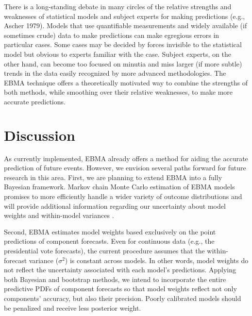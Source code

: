\documentclass[12pt,fullpage,endnotes]{article}
\begin{document}
 

There is a long-standing debate in many circles of the relative
strengths and weaknesses of statistical models and subject experts for
making predictions (e.g., Ascher 1979). Models that use quantifiable
measurements and widely available (if sometimes crude) data to make
predictions can make egregious errors in particular cases. Some cases
may be decided by forces invisible to the statistical model but
obvious to experts familiar with the case. Subject experts, on the
other hand, can become too focused on minutia and miss larger (if more
subtle) trends in the data easily recognized by more advanced
methodologies. The EBMA technique offers a theoretically motivated way
to combine the strengths of both methods, while smoothing over their
relative weaknesses, to make more accurate predictions.

\section{Discussion} %

As currently implemented, EBMA already offers a method for aiding the
accurate prediction of future events.  However, we envision several
paths forward for future research in this area. First, we are planning
to extend EBMA into a fully Bayesian framework. Markov chain Monte
Carlo estimation of EBMA models promises to more efficiently handle a
wider variety of outcome distributions and will provide additional
information regarding our uncertainty about model weights and
within-model variances \citep{Vrugt:2008}.

Second, EBMA estimates model weights based exclusively on the point
predictions of component forecasts.  Even for continuous data (e.g.,
the presidential vote forecasts), the current procedure assumes that
the within-forecast variance ($\sigma^2$) is constant across models.
In other words, model weights do not reflect the uncertainty
associated with each model's predictions.  Applying both Bayesian and
bootstrap methods, we intend to incorporate the entire predictive PDFs
of component forecasts so that model weights reflect not only
components' accuracy, but also their precision.  Poorly calibrated
models should be penalized and receive less posterior weight.
\end{document}
